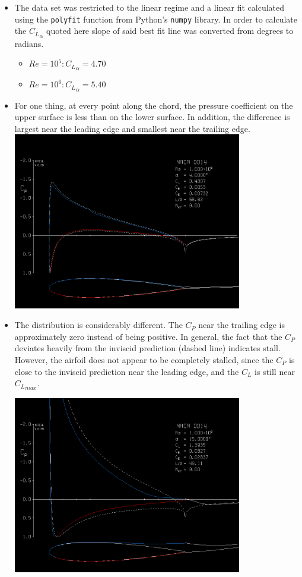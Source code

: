 \documentclass{article}
\begin{document}
\begin{itemize}
\item{The data set was restricted to the linear regime and a linear fit calculated using the \verb|polyfit| function from Python's \verb|numpy|
library.  In order to calculate the ${C_L}_\alpha$ quoted here slope of said best fit line was converted from degrees to radians.}
\begin{itemize}
\item{$Re = 10^5 : {C_L}_\alpha = 4.70$}
\item{$Re = 10^6 : {C_L}_\alpha = 5.40$}
\end{itemize}

\item{For one thing, at every point along the chord, the pressure coefficient on the upper surface is less than on the lower surface. 
In addition, the difference is largest near the leading edge and smallest near the trailing edge.}
\includegraphics[width = 10cm]{alfa_4.png}

\item{The distribution is considerably different.  The $C_P$ near the trailing edge is approximately zero instead of being positive.
 In general, the fact that the $C_P$ deviates heavily from the inviscid prediction (dashed line) indicates stall.  However, the airfoil
does not appear to be completely stalled, since the $C_P$ is close to the inviscid prediction near the leading edge, and the $C_L$ is still
near ${C_L}_{max}$.}

\includegraphics[width = 10cm]{alfa_15.png}


\end{itemize}
\end{document}
